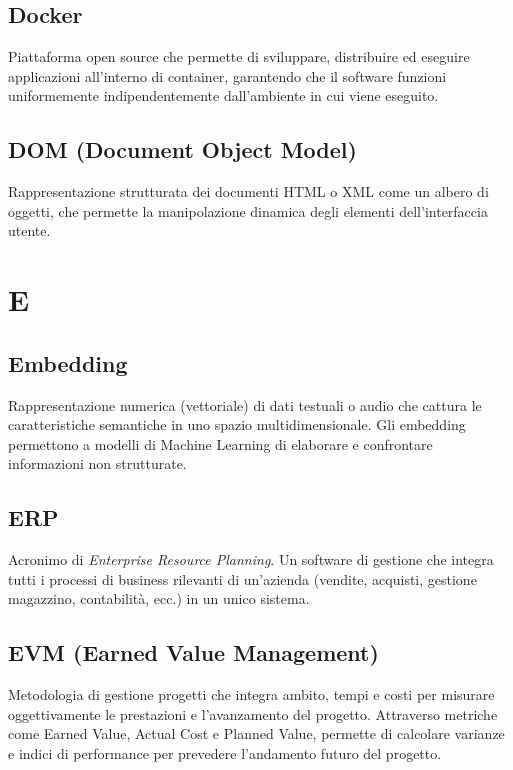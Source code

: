 \documentclass[a4paper, 11pt, oneside]{scrartcl} %
\begin{document}
\subsection*{Docker}
Piattaforma open source che permette di sviluppare, distribuire ed eseguire applicazioni all'interno di container, garantendo che il software funzioni uniformemente indipendentemente dall'ambiente in cui viene eseguito.
\vspace{0.5cm}

\subsection*{DOM (Document Object Model)}
Rappresentazione strutturata dei documenti HTML o XML come un albero di oggetti, che permette la manipolazione dinamica degli elementi dell'interfaccia utente.
\vspace{0.5cm}


\section*{E}


\subsection*{Embedding}
Rappresentazione numerica (vettoriale) di dati testuali o audio che cattura le caratteristiche semantiche in uno spazio multidimensionale. Gli embedding permettono a modelli di Machine Learning di elaborare e confrontare informazioni non strutturate.
\vspace{0.5cm}

\subsection*{ERP}
Acronimo di \textit{Enterprise Resource Planning}. Un software di gestione che integra tutti i processi di business rilevanti di un'azienda (vendite, acquisti, gestione magazzino, contabilità, ecc.) in un unico sistema.
\vspace{0.5cm}

\subsection*{EVM (Earned Value Management)}
Metodologia di gestione progetti che integra ambito, tempi e costi per misurare oggettivamente le prestazioni e l'avanzamento del progetto. Attraverso metriche come Earned Value, Actual Cost e Planned Value, permette di calcolare varianze e indici di performance per prevedere l'andamento futuro del progetto.
\vspace{0.5cm}
\end{document}
